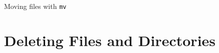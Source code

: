 \begin{frame}[fragile]{Moving files with \alert{\texttt{mv}}}
\end{frame}
\section{Deleting Files and Directories}
